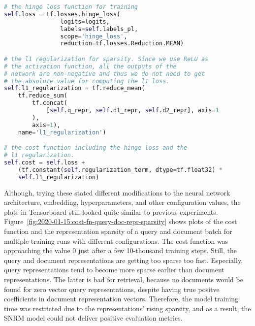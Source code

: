 \begin{lstlisting}[language=Python,frame=single,breaklines=true,float=tbh,caption=Cost function calculation in SNRM TensorFlow implementation,label=tensorflow-cost-function-calc]
# the hinge loss function for training
self.loss = tf.losses.hinge_loss(
                logits=logits, 
                labels=self.labels_pl, 
                scope='hinge_loss', 
                reduction=tf.losses.Reduction.MEAN)

# the l1 regularization for sparsity. Since we use ReLU as 
# the activation function, all the outputs of the
# network are non-negative and thus we do not need to get 
# the absolute value for computing the l1 loss.
self.l1_regularization = tf.reduce_mean(
    tf.reduce_sum(
        tf.concat(
            [self.q_repr, self.d1_repr, self.d2_repr], axis=1
        ), 
        axis=1),
    name='l1_regularization')

# the cost function including the hinge loss and the 
# l1 regularization.
self.cost = self.loss + 
    (tf.constant(self.regularization_term, dtype=tf.float32) * 
    self.l1_regularization)
\end{lstlisting}

Although, trying these stated different modifications to the neural network architecture, 
    embedding, hyperparameters, and other configuration values,
    the plots in Tensorboard still looked quite similar to previous experiments.
Figure~\ref{fig:2020-01-15:cost-fn-query-doc-repr-sparsity} shows plots of the 
    cost function and the representation sparsity of a query and document batch 
    for multiple training runs with different configurations.
The cost function was approaching the value 0 just after a few 10-thousand training steps.
Still, the query and document representations are getting too sparse too fast.
Especially, query representations tend to become more sparse earlier than document representations.
The latter is bad for retrieval, because no documents would be found for zero vector query representations, 
    despite having true positve coefficients in document representation vectors.
Therefore, the model training time was restricted due to the representations' rising sparsity,
    and as a result, the SNRM model could not deliver positive evaluation metrics.

